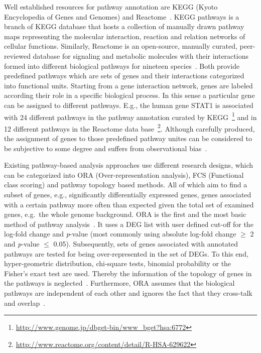 \documentclass[10pt,a4paper,twocolumn]{article}
\begin{document}
Well established resources for pathway annotation are KEGG (Kyoto
Encyclopedia of Genes and Genomes)\cite{Kegg} and
Reactome~\cite{Reactome}. KEGG pathways is a branch of KEGG database that
hosts a collection of manually drawn pathway maps representing the
molecular interaction, reaction and relation networks of cellular
functions. Similarly, Reactome is an open-source, manually curated,
peer-reviewed database for signaling and metabolic molecules with their
interactions formed into different biological pathways for nineteen
species~\cite{Reactome}. Both provide predefined pathways which are sets of
genes and their interactions categorized into functional units. Starting
from a gene interaction network, genes are labeled according their role in
a specific biological process. In this sense a particular gene can be
assigned to different pathways. E.g., the human gene STAT1 is associated
with 24 different pathways in the pathway annotation curated by
KEGG~\footnote{\url{http://www.genome.jp/dbget-bin/www_bget?hsa:6772}} and
in 12 different pathways in the Reactome data
base~\footnote{\url{http://www.reactome.org/content/detail/R-HSA-629622}}.
Although carefully produced, the assignment of genes to those predefined
pathway unites can be considered to be subjective to some degree and
suffers from observational bias~\cite{schnoes2013biases}.

Existing pathway-based analysis approaches use different research
designs, which can be categorized into ORA (Over-representation
analysis), FCS (Functional class scoring) and pathway topology based
methods. All of which aim to find a subset of genes, e.g.,
significantly differentially expressed genes, genes associated with a
certain pathway more often than expected given the total set of
examined genes, e.g.~the whole genome background. ORA is
  the first and the most basic method of pathway analysis~\cite{Campos}. It uses a
DEG list with user defined cut-off for the log-fold change and
\textit{p}-value (most commonly using absolute log-fold change $\geq$
2 and \textit{p}-value $\leq$ 0.05). Subsequently, sets of genes
associated with annotated pathways are tested for being
over-represented in the set of DEGs. To this end, hyper-geometric
distribution, chi-square tests, binomial probability or the Fisher’s
exact test are used. Thereby the information of the topology of genes
in the pathways is neglected~\cite{Bayer}. Furthermore, ORA assumes
that the biological pathways are independent of each other and ignores
the fact that they cross-talk and overlap~\cite{Khatri2012,Campos}.
\end{document}
